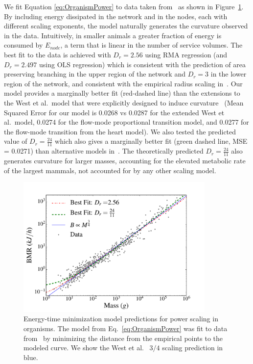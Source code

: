 \documentclass[12pt]{article}
\begin{document}
We fit Equation \ref{eq:OrganismPower} to data taken from~\cite{kolokotrones2010curvature} as shown
in Figure~\ref{fig:OrganismsPowerScaling}. By including energy dissipated in
the network and in the nodes, each with different scaling exponents, the model
naturally generates the curvature observed in the data.  Intuitively, in
smaller animals a greater fraction of energy is consumed by $E_{node}$, a term
that is linear in the number of service volumes. The best fit to
the data is achieved with $D_r = 2.56$ using RMA regression (and $D_r = 2.497$ using OLS regression) which is consistent with the prediction
of area preserving branching in the upper region of the network and $D_r = 3$
in the lower region of the network, and consistent with the empirical radius
scaling in~\cite{newberry2015testing}.  Our model provides a marginally better
fit (red-dashed line) than the extensions to the West et al.\ model that were explicitly designed
to induce curvature~\cite{kolokotrones2010curvature} (Mean Squared Error for
our model is 0.0268 vs 0.0287 for the extended West et al.\ model, 0.0274 for
the flow-mode proportional transition model, and 0.0277 for the flow-mode
transition from the heart model).  We also tested the predicted value of $D_r =
\frac{24}{11}$ which also gives a marginally better fit (green dashed line, MSE
= 0.0271) than alternative models in~\cite{kolokotrones2010curvature}. The
theoretically predicted $D_r =\frac{24}{11}$ also generates curvature for larger masses, accounting for the elevated metabolic rate of the largest mammals, not accounted for by any other scaling model.
 
\begin{figure}[!h] \centering
  \includegraphics[height=70mm]{Figures/OrganismsPowerScalingv2.pdf}

  \caption{Energy-time minimization model predictions for power
    scaling in organisms. The model from Eq.~\ref{eq:OrganismPower}
    was fit to data from~\cite{kolokotrones2010curvature} by minimizing the distance
    from the empirical points to the modeled curve. We show the West et al.~\cite{west97} $3/4$ scaling prediction in blue.
    }
\label{fig:OrganismsPowerScaling}
\end{figure}
\end{document}
